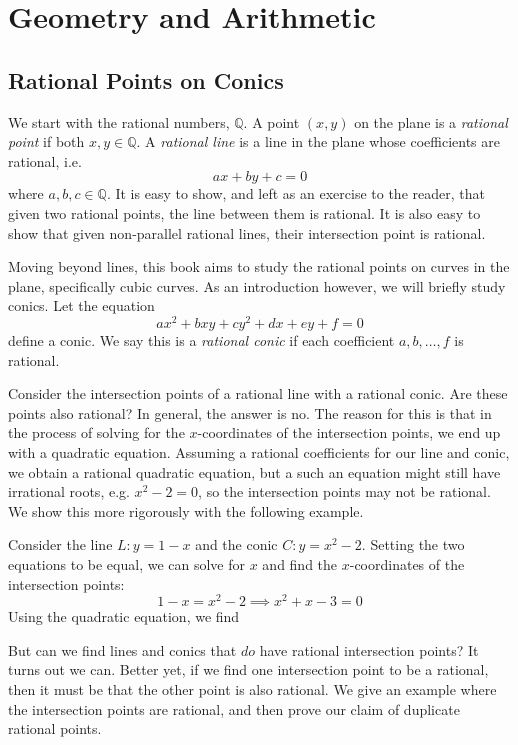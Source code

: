 \documentclass[12pt]{book}
\newcommand{\Q}{\mathbb{Q}}
\begin{document}
    \pagestyle{fancy}

    \chapter{Geometry and Arithmetic}
    \thispagestyle{empty}
    \fancyhead[EL]{\textbf{\thepage}}
    \fancyhead[OR]{\textbf{\thepage}}
    \fancyfoot{}
    
    \section{Rational Points on Conics}

    We start with the rational numbers, $\Q$.
    A point $(x,y)$ on the plane is a \textit{rational point} if both 
    $x,y\in\Q$.
    A \textit{rational line} is a line in the plane whose coefficients
    are rational, i.e.
    \[ax+by+c=0\]
    where $a,b,c\in\Q$.
    It is easy to show, and left as an exercise to the reader,
    that given two rational points, the line between them is rational.
    It is also easy to show that given non-parallel rational lines,
    their intersection point is rational.

    Moving beyond lines, this book aims to study the rational points on
    curves in the plane, specifically cubic curves.
    As an introduction however, we will briefly study conics.
    Let the equation
    \[ax^2+bxy+cy^2+dx+ey+f=0\]
    define a conic.
    We say this is a \textit{rational conic} if each coefficient
    $a,b,\dots,f$ is rational.
    
    Consider the intersection points of a rational line with a rational conic.
    Are these points also rational?
    In general, the answer is no.
    The reason for this is that in the process of solving for the 
    $x$-coordinates of the intersection points, we end up with a quadratic 
    equation.
    Assuming a rational coefficients for our line and conic, we obtain
    a rational quadratic equation, but a such an equation might still
    have irrational roots, e.g. $x^2-2=0$, so the intersection points
    may not be rational. We show this more rigorously with the following example.
    
    \pagebreak
    Consider the line $L:y=1-x$ and the conic $C:y=x^2-2$.
    Setting the two equations to be equal, we can solve for $x$ and find
    the $x$-coordinates of the intersection points:
    \[1-x=x^2-2\implies x^2+x-3=0\]
    Using the quadratic equation, we find 

    But can we find lines and conics that $\textit{do}$ have rational intersection points? It turns out we can. Better yet, if we find one intersection point to be a rational, then it must be that the other point is also rational. We give an example where the intersection points are rational, and then prove our claim of duplicate rational points.
\end{document}
